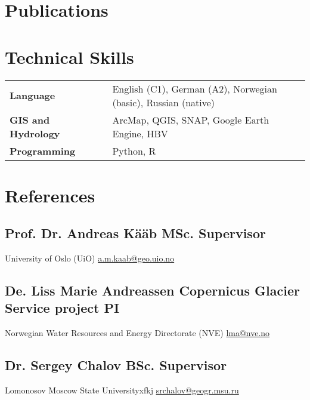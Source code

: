 \documentclass[a4,10pt]{article}
\newcommand{\hskills}[1]{
\textbf{\bfseries #1} }
\begin{document}
\section{Publications} 
\renewcommand\refname{\vskip -1.5em}
\nocite{*}
\printbibliography[heading=none]
\vspace{-0.4cm}


\section{Technical Skills}
\begin{tabular}{p{11em} p{1em} p{43em}}
\hskills{Language} &  &  English (C1), German (A2), Norwegian (basic), Russian (native) \\
\hskills{GIS and Hydrology} &  & ArcMap, QGIS, SNAP, Google Earth Engine, HBV  \\
\hskills{Programming} &  & Python, R \\
\end{tabular}
\vspace{-0.2cm}




\section{References} 

\subsection*{Prof. Dr. Andreas Kääb  \hfill MSc. Supervisor} 
University of Oslo (UiO) \hfill \href{a.m.kaab@geo.uio.no}{a.m.kaab@geo.uio.no} 
\vspace{0.1cm}

\subsection*{De. Liss Marie Andreassen \hfill Copernicus Glacier Service project PI}
Norwegian Water Resources and Energy Directorate (NVE) \hfill \href{lma@nve.no}{lma@nve.no}

\vspace{0.1cm}
\subsection*{Dr. Sergey Chalov \hfill BSc. Supervisor}
Lomonosov Moscow State Universityxfkj \hfill \href{srchalov@geogr.msu.ru}{srchalov@geogr.msu.ru}


\end{document}
